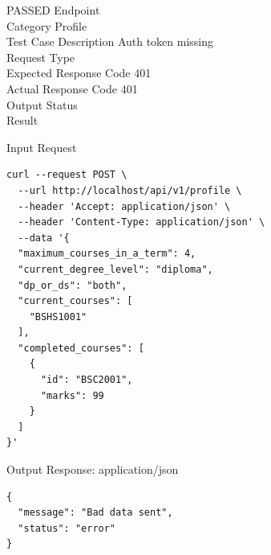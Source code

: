 \begin{testcase}{19}{PASSED}
Endpoint \hfill {}\\
Category \hfill Profile\\
Test Case Description \hfill Auth token missing\\

Request Type    \hfill {}\\
Expected Response Code    \hfill 401\\
Actual Response Code    \hfill 401\\

Output Status \hfill {}\\
Result \hfill {}

\begin{ipblock}{Input Request}
\begin{verbatim}
curl --request POST \
  --url http://localhost/api/v1/profile \
  --header 'Accept: application/json' \
  --header 'Content-Type: application/json' \
  --data '{
  "maximum_courses_in_a_term": 4,
  "current_degree_level": "diploma",
  "dp_or_ds": "both",
  "current_courses": [
    "BSHS1001"
  ],
  "completed_courses": [
    {
      "id": "BSC2001",
      "marks": 99
    }
  ]
}'
\end{verbatim}
\end{ipblock}

\begin{opblock}{Output Response: application/json}
\begin{verbatim}
{
  "message": "Bad data sent",
  "status": "error"
}
\end{verbatim}
\end{opblock}
\end{testcase}

